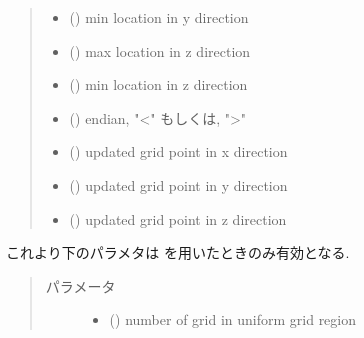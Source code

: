 \documentclass[letterpaper,10pt,dvipdfmx,report]{sphinxmanual}
\begin{document}
\begin{fulllineitems}
\begin{quote}
\begin{description}
\begin{itemize}
\item {} 
 () \sphinxhyphen{}\sphinxhyphen{} min location in y direction

\item {} 
 () \sphinxhyphen{}\sphinxhyphen{} max location in z direction

\item {} 
 () \sphinxhyphen{}\sphinxhyphen{} min location in z direction

\item {} 
 () \sphinxhyphen{}\sphinxhyphen{} endian, "\textless{}" もしくは, "\textgreater{}"

\item {} 
 () \sphinxhyphen{}\sphinxhyphen{} updated grid point in x direction

\item {} 
 () \sphinxhyphen{}\sphinxhyphen{} updated grid point in y direction

\item {} 
 () \sphinxhyphen{}\sphinxhyphen{} updated grid point in z direction

\end{itemize}

\end{description}\end{quote}

これより下のパラメタは  を用いたときのみ有効となる.
\begin{quote}\begin{description}
\item[{パラメータ}] \leavevmode\begin{itemize}
\item {} 
 () \sphinxhyphen{}\sphinxhyphen{} number of grid in uniform grid region


\end{itemize}
\end{description}
\end{quote}
\end{fulllineitems}
\end{document}
